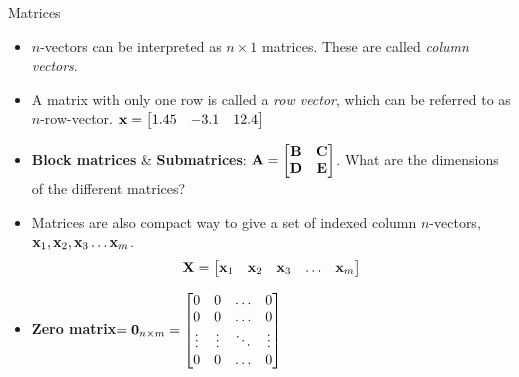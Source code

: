 \documentclass[aspectratio=169]{beamer}
\def\mf{\ensuremath\mathbf}
\begin{document}
\begin{frame}[t]{Matrices}
\begin{itemize}
    \item $n$-vectors can be interpreted as $n \times 1$ matrices. These are called \textit{column vectors}.
    \item A matrix with only one row is called a \textit{row vector}, which can be referred to as $n$-row-vector.  $\mf{x} = \begin{bmatrix}1.45 & -3.1 & 12.4\end{bmatrix}$
    \item\textbf{Block matrices} \& \textbf{Submatrices}: $\mf{A} = \begin{bmatrix}
    \mf{B} & \mf{C} \\
    \mf{D} & \mf{E}
    \end{bmatrix}$.  What are the dimensions of the different matrices?
    \item Matrices are also compact way to give a set of indexed column $n$-vectors, 
    $\mf{x}_1, \mf{x}_2, \mf{x}_3 \ldots \mf{x}_m$. 
    $$\mf{X} = \begin{bmatrix}
    \mf{x}_1 & \mf{x}_2 & \mf{x}_3 & \ldots & \mf{x}_m
    \end{bmatrix}$$
    \item \textbf{Zero matrix}$ = \mf{0}_{n\times m} = \begin{bmatrix}
    0 & 0 & \ldots & 0\\
    0 & 0 & \ldots & 0\\
    \vdots & \vdots & \ddots & \vdots\\
    0 & 0 & \ldots & 0
    \end{bmatrix}$
\end{itemize}
\end{frame}
\end{document}

